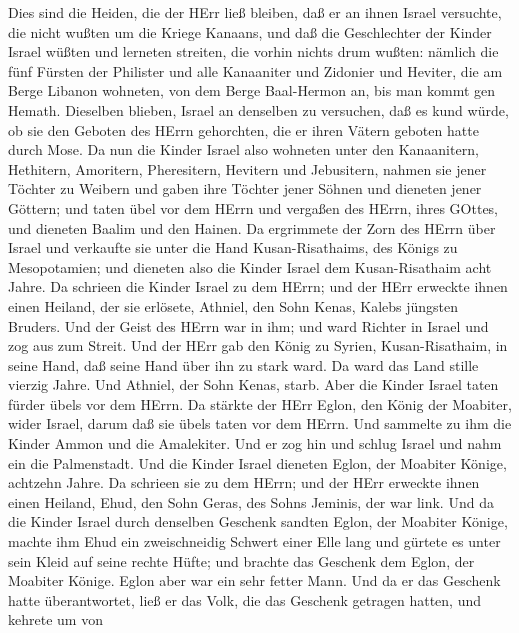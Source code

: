  Dies sind die Heiden, die der HErr ließ bleiben, daß er an
ihnen Israel versuchte, die nicht wußten um die Kriege Kanaans,
 und daß die Geschlechter der Kinder Israel wüßten und
lerneten streiten, die vorhin nichts drum wußten:  nämlich
die fünf Fürsten der Philister und alle Kanaaniter und Zidonier und
Heviter, die am Berge Libanon wohneten, von dem Berge Baal-Hermon an,
bis man kommt gen Hemath.  Dieselben blieben, Israel an
denselben zu versuchen, daß es kund würde, ob sie den Geboten des HErrn
gehorchten, die er ihren Vätern geboten hatte durch Mose. 
Da nun die Kinder Israel also wohneten unter den Kanaanitern, Hethitern,
Amoritern, Pheresitern, Hevitern und Jebusitern,  nahmen sie
jener Töchter zu Weibern und gaben ihre Töchter jener Söhnen und
dieneten jener Göttern;  und taten übel vor dem HErrn und
vergaßen des HErrn, ihres GOttes, und dieneten Baalim und den Hainen.
 Da ergrimmete der Zorn des HErrn über Israel und verkaufte
sie unter die Hand Kusan-Risathaims, des Königs zu Mesopotamien; und
dieneten also die Kinder Israel dem Kusan-Risathaim acht Jahre.
 Da schrieen die Kinder Israel zu dem HErrn; und der HErr
erweckte ihnen einen Heiland, der sie erlösete, Athniel, den Sohn Kenas,
Kalebs jüngsten Bruders.  Und der Geist des HErrn war in
ihm; und ward Richter in Israel und zog aus zum Streit. Und der HErr gab
den König zu Syrien, Kusan-Risathaim, in seine Hand, daß seine Hand über
ihn zu stark ward.  Da ward das Land stille vierzig Jahre.
Und Athniel, der Sohn Kenas, starb.  Aber die Kinder Israel
taten fürder übels vor dem HErrn. Da stärkte der HErr Eglon, den König
der Moabiter, wider Israel, darum daß sie übels taten vor dem HErrn.
 Und sammelte zu ihm die Kinder Ammon und die Amalekiter.
Und er zog hin und schlug Israel und nahm ein die Palmenstadt.
 Und die Kinder Israel dieneten Eglon, der Moabiter Könige,
achtzehn Jahre.  Da schrieen sie zu dem HErrn; und der HErr
erweckte ihnen einen Heiland, Ehud, den Sohn Geras, des Sohns Jeminis,
der war link. Und da die Kinder Israel durch denselben Geschenk sandten
Eglon, der Moabiter Könige,  machte ihm Ehud ein
zweischneidig Schwert einer Elle lang und gürtete es unter sein Kleid
auf seine rechte Hüfte;  und brachte das Geschenk dem
Eglon, der Moabiter Könige. Eglon aber war ein sehr fetter Mann.
 Und da er das Geschenk hatte überantwortet, ließ er das
Volk, die das Geschenk getragen hatten,  und kehrete um von
